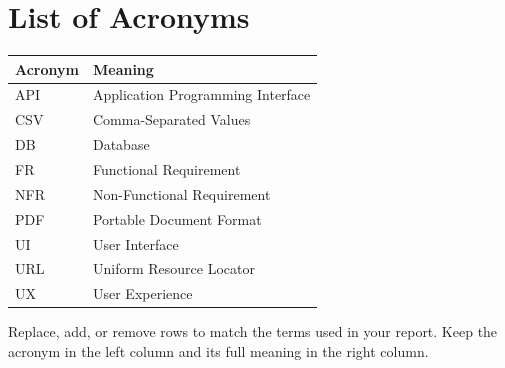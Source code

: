 \chapter*{List of Acronyms}

\renewcommand{\arraystretch}{1.2}
\begin{longtable}{p{3cm} p{11cm}}
\toprule
\textbf{Acronym} & \textbf{Meaning} \\
\midrule
\endhead

API & Application Programming Interface \\
CSV & Comma-Separated Values \\
DB & Database \\
FR & Functional Requirement \\
NFR & Non-Functional Requirement \\
PDF & Portable Document Format \\
UI & User Interface \\
URL & Uniform Resource Locator \\
UX & User Experience \\

\bottomrule
\end{longtable}

Replace, add, or remove rows to match the terms used in your report. Keep the acronym in the left column and its full meaning in the right column.
